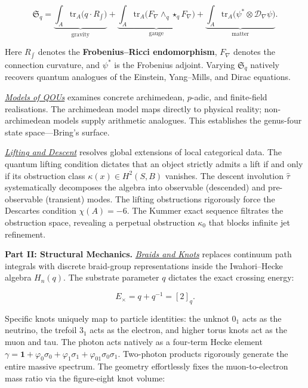 \[
  \mathfrak{S}_q = \underbrace{\textstyle\int_A \mathrm{tr}_A\bigl(q \cdot R_{\int}\bigr)}_{\text{gravity}} + \underbrace{\textstyle\int_A \mathrm{tr}_A\bigl( F_\nabla \wedge_q \star_q F_\nabla \bigr)}_{\text{gauge}} + \underbrace{\textstyle\int_A \mathrm{tr}_A\bigl(\psi^{\ast} \otimes \mathcal{D}_\nabla\psi\bigr)}_{\text{matter}}.
\]

Here $R_{\int}$ denotes the \textbf{Frobenius–Ricci endomorphism}, $F_\nabla$ denotes the connection curvature, and $\psi^{\ast}$ is the Frobenius adjoint. Varying $\mathfrak{S}_q$ natively recovers quantum analogues of the Einstein, Yang–Mills, and Dirac equations.

\hyperref[chap:models-qou]{\emph{Models of QOUs}} examines concrete archimedean, $p$-adic, and finite-field realisations. The archimedean model maps directly to physical reality; non-archimedean models supply arithmetic analogues. This establishes the genus-four state space—Bring's surface.

\hyperref[chap:torsion]{\emph{Lifting and Descent}} resolves global extensions of local categorical data. The quantum lifting condition dictates that an object strictly admits a lift if and only if its obstruction class $\kappa(x) \in H^2(S, B)$ vanishes. The descent involution $\hat{\tau}$ systematically decomposes the algebra into observable (descended) and pre-observable (transient) modes. The lifting obstructions rigorously force the Descartes condition $\chi(A) = -6$. The Kummer exact sequence filtrates the obstruction space, revealing a perpetual obstruction $\kappa_0$ that blocks infinite jet refinement.

\textbf{Part II: Structural Mechanics.}
\hyperref[chap:path-integrals-braiding]{\emph{Braids and Knots}} replaces continuum path integrals with discrete braid-group representations inside the Iwahori–Hecke algebra $H_n(q)$. The substrate parameter $q$ dictates the exact crossing energy:

\[
  E_\times = q + q^{-1} = [2]_q.
\]

Specific knots uniquely map to particle identities: the unknot $0_1$ acts as the neutrino, the trefoil $3_1$ acts as the electron, and higher torus knots act as the muon and tau. The photon acts natively as a four-term Hecke element $\gamma =\allowbreak{} \mathbf{1} +\allowbreak{} \varphi_0\sigma_0 +\allowbreak{} \varphi_1\sigma_1 +\allowbreak{} \varphi_{01}\sigma_0\sigma_1$. Two-photon products rigorously generate the entire massive spectrum. The geometry effortlessly fixes the muon-to-electron mass ratio via the figure-eight knot volume:

